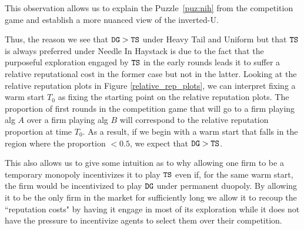 \documentclass[../competing_bandits.tex]{subfiles}
\begin{document}
This observation allows us to explain the Puzzle~\ref{puz:nih} from the competition game and establish a more nuanced view of the inverted-U.


Thus, the reason we see that $\mathtt{DG} > \mathtt{TS}$ under Heavy Tail and Uniform but that $\mathtt{TS}$ is always preferred under Needle In Haystack is due to the fact that the purposeful exploration engaged by $\mathtt{TS}$ in the early rounds leads it to suffer a relative reputational cost in the former case but not in the latter. Looking at the relative reputation plots in Figure \ref{relative_rep_plots}, we can interpret fixing a warm start $T_0$ as fixing the starting point on the relative reputation plots. The proportion of first rounds in the competition game that will go to a firm playing alg $A$ over a firm playing alg $B$ will correspond to the relative reputation proportion at time $T_0$. As a result, if we begin with a warm start that falls in the region where the proportion $< 0.5$, we expect that $\mathtt{DG} > \mathtt{TS}$.

This also allows us to give some intuition as to why allowing one firm to be a temporary monopoly incentivizes it to play $\mathtt{TS}$ even if, for the same warm start, the firm would be incentivized to play $\mathtt{DG}$ under permanent duopoly.  By allowing it to be the only firm in the market for sufficiently long we allow it to recoup the ``reputation costs" by having it engage in most of its exploration while it does not have the pressure to incentivize agents to select them over their competition.
\end{document}
